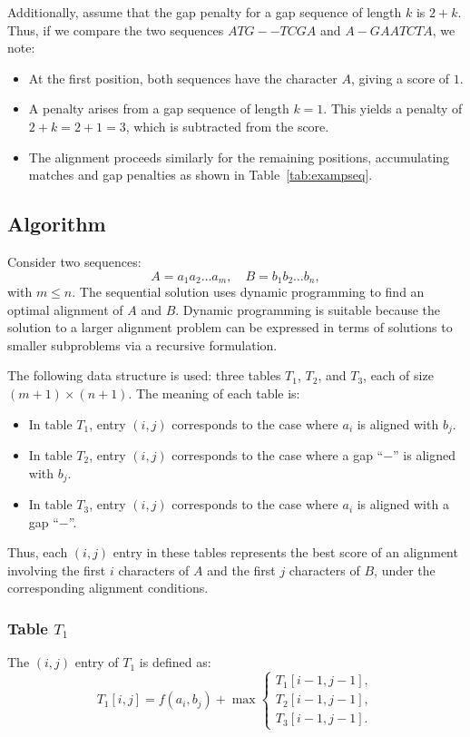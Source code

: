 \documentclass[12pt]{book}
\begin{document}
Additionally, assume that the gap penalty for a gap sequence of length $k$ is $2+k$. Thus, if we compare the two sequences $ATG--TCGA$ and $A-GAATCTA$, we note:
\begin{itemize}
    \item At the first position, both sequences have the character $A$, giving a score of $1$.
    \item A penalty arises from a gap sequence of length $k=1$. This yields a penalty of $2+k = 2+1=3$, which is subtracted from the score.
    \item The alignment proceeds similarly for the remaining positions, accumulating matches and gap penalties as shown in Table~\ref{tab:exampseq}.
\end{itemize}

\subsection*{Algorithm}
Consider two sequences:
\[
A = a_1 a_2 \ldots a_m, \quad B = b_1 b_2 \ldots b_n,
\]
with $m \leq n$. The sequential solution uses dynamic programming to find an optimal alignment of $A$ and $B$. Dynamic programming is suitable because the solution to a larger alignment problem can be expressed in terms of solutions to smaller subproblems via a recursive formulation.

The following data structure is used: three tables $T_1$, $T_2$, and $T_3$, each of size $(m+1)\times(n+1)$. The meaning of each table is:
\begin{itemize}
    \item In table $T_1$, entry $(i,j)$ corresponds to the case where $a_i$ is aligned with $b_j$.
    \item In table $T_2$, entry $(i,j)$ corresponds to the case where a gap ``$-$'' is aligned with $b_j$.
    \item In table $T_3$, entry $(i,j)$ corresponds to the case where $a_i$ is aligned with a gap ``$-$''.
\end{itemize}

Thus, each $(i,j)$ entry in these tables represents the best score of an alignment involving the first $i$ characters of $A$ and the first $j$ characters of $B$, under the corresponding alignment conditions.

\subsubsection{Table $T_1$}
The $(i,j)$ entry of $T_1$ is defined as:
\[
T_1[i,j] = f(a_i,b_j) + \max
\begin{cases}
    T_1[i-1,j-1], \\
    T_2[i-1,j-1], \\
    T_3[i-1,j-1].
\end{cases}
\]
\end{document}
